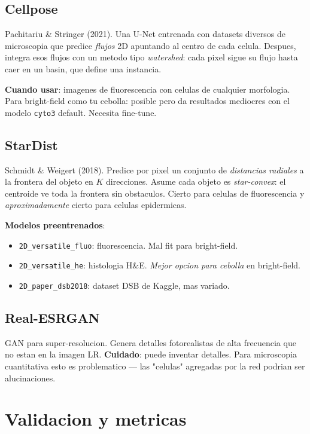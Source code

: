 \documentclass[11pt,a4paper,twoside,openright]{book}
\begin{document}
\section{Cellpose}

Pachitariu \& Stringer (2021). Una U-Net entrenada con datasets diversos de microscopia que predice \emph{flujos} 2D apuntando al centro de cada celula. Despues, integra esos flujos con un metodo tipo \emph{watershed}: cada pixel sigue su flujo hasta caer en un basin, que define una instancia.

\textbf{Cuando usar}: imagenes de fluorescencia con celulas de cualquier morfologia. Para bright-field como tu cebolla: posible pero da resultados mediocres con el modelo \texttt{cyto3} default. Necesita fine-tune.

\section{StarDist}

Schmidt \& Weigert (2018). Predice por pixel un conjunto de \emph{distancias radiales} a la frontera del objeto en $K$ direcciones. Asume cada objeto es \emph{star-convex}: el centroide ve toda la frontera sin obstaculos. Cierto para celulas de fluorescencia y \emph{aproximadamente} cierto para celulas epidermicas.

\textbf{Modelos preentrenados}:
\begin{itemize}[leftmargin=2em]
  \item \texttt{2D\_versatile\_fluo}: fluorescencia. Mal fit para bright-field.
  \item \texttt{2D\_versatile\_he}: histologia H\&E. \emph{Mejor opcion para cebolla} en bright-field.
  \item \texttt{2D\_paper\_dsb2018}: dataset DSB de Kaggle, mas variado.
\end{itemize}

\section{Real-ESRGAN}

GAN para super-resolucion. Genera detalles fotorealistas de alta frecuencia que no estan en la imagen LR. \textbf{Cuidado}: puede inventar detalles. Para microscopia cuantitativa esto es problematico --- las "celulas" agregadas por la red podrian ser alucinaciones.

\chapter{Validacion y metricas}
\label{ch:metrics}
\end{document}
